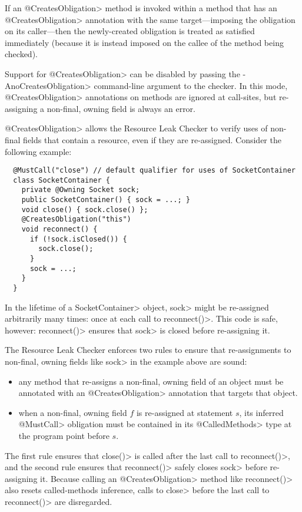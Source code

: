 If an \<@CreatesObligation>
method is invoked within a method that has an \<@CreatesObligation> annotation
with the same target---imposing the obligation on its caller---then
the newly-created obligation is treated as satisfied immediately (because it is instead imposed
on the callee of the method being checked).

Support for \<@CreatesObligation> can be disabled by passing the \<-AnoCreatesObligation> command-line
argument to the checker. In this mode, \<@CreatesObligation> annotations on methods are ignored at call-sites,
but re-assigning a non-final, owning field is always an error.



\<@CreatesObligation> allows the Resource Leak Checker to verify uses of non-final fields
that contain a resource, even if they are re-assigned. Consider
the following example:

\begin{verbatim}
  @MustCall("close") // default qualifier for uses of SocketContainer
  class SocketContainer {
    private @Owning Socket sock;
    public SocketContainer() { sock = ...; }
    void close() { sock.close() };
    @CreatesObligation("this")
    void reconnect() {
      if (!sock.isClosed()) {
        sock.close();
      }
      sock = ...;
    }
  }
\end{verbatim}

In the lifetime of a \<SocketContainer> object, \<sock>
might be re-assigned arbitrarily many times: once at each
call to \<reconnect()>. This code is safe, however: \<reconnect()>
ensures that \<sock> is closed before re-assigning it.

The Resource Leak Checker enforces two rules to ensure that
re-assignments to non-final, owning fields like \<sock> in the example
above are sound:
\begin{itemize}
\item any method that re-assigns a non-final, owning field of an object
  must be annotated with an \<@CreatesObligation> annotation
  that targets that object.
\item when a non-final, owning field $f$ is re-assigned at statement $s$,
  its inferred \<@MustCall> obligation must be contained in its \<@CalledMethods>
  type at the program point before $s$.
\end{itemize}
\noindent
The first rule ensures that \<close()> is called after the last call
to \<reconnect()>, and the second rule ensures that \<reconnect()>
safely closes \<sock> before re-assigning it. Because calling
an \<@CreatesObligation> method like \<reconnect()> also resets called-methods
inference, calls to \<close> before the last call to \<reconnect()>
are disregarded.


